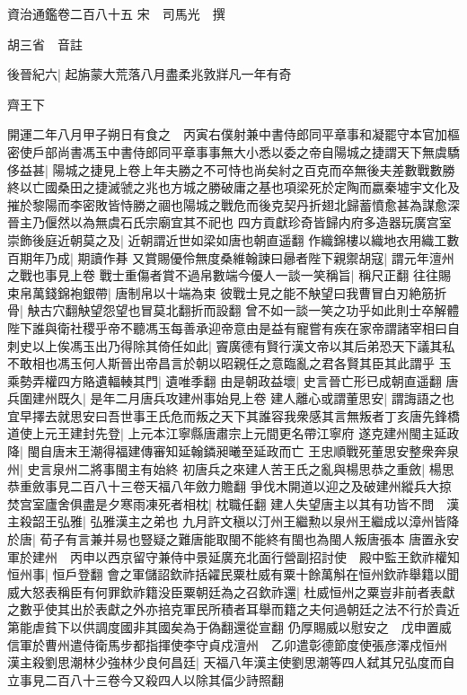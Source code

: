 資治通鑑卷二百八十五
宋　司馬光　撰

胡三省　音註

後晉紀六|{
	起旃蒙大荒落八月盡柔兆敦牂凡一年有奇}


齊王下

開運二年八月甲子朔日有食之　丙寅右僕射兼中書侍郎同平章事和凝罷守本官加樞密使戶部尚書馮玉中書侍郎同平章事事無大小悉以委之帝自陽城之捷謂天下無虞驕侈益甚|{
	陽城之捷見上卷上年夫勝之不可恃也尚矣紂之百克而卒無後夫差數戰數勝終以亡國桑田之捷滅虢之兆也方城之勝破庸之基也項梁死於定陶而嬴秦墟宇文化及摧於黎陽而李密敗皆恃勝之祻也陽城之戰危而後克契丹折翅北歸蓄憤愈甚為謀愈深晉主乃偃然以為無虞石氏宗廟宜其不祀也}
四方貢獻珍奇皆歸内府多造器玩廣宫室崇飾後庭近朝莫之及|{
	近朝謂近世如梁如唐也朝直遥翻}
作織錦樓以織地衣用織工數百期年乃成|{
	期讀作朞}
又賞賜優伶無度桑維翰諫曰曏者陛下親禦胡寇|{
	謂元年澶州之戰也事見上卷}
戰士重傷者賞不過帛數端今優人一談一笑稱旨|{
	稱尺正翻}
往往賜束帛萬錢錦袍銀帶|{
	唐制帛以十端為束}
彼戰士見之能不觖望曰我曹冒白刃絶筋折骨|{
	觖古穴翻觖望怨望也冒莫北翻折而設翻}
曾不如一談一笑之功乎如此則士卒解體陛下誰與衛社稷乎帝不聽馮玉每善承迎帝意由是益有寵嘗有疾在家帝謂諸宰相曰自刺史以上俟馮玉出乃得除其倚任如此|{
	竇廣德有賢行漢文帝以其后弟恐天下議其私不敢相也馮玉何人斯晉出帝昌言於朝以昭親任之意臨亂之君各賢其臣其此謂乎}
玉乘勢弄權四方賂遺輻輳其門|{
	遺唯季翻}
由是朝政益壞|{
	史言晉亡形已成朝直遥翻}
唐兵圍建州既久|{
	是年二月唐兵攻建州事始見上卷}
建人離心或謂董思安|{
	謂誨語之也}
宜早擇去就思安曰吾世事王氏危而叛之天下其誰容我衆感其言無叛者丁亥唐先鋒橋道使上元王建封先登|{
	上元本江寧縣唐肅宗上元間更名帶江寧府}
遂克建州閩主延政降|{
	閩自唐末王潮得福建傳審知延翰鏻昶曦至延政而亡}
王忠順戰死董思安整衆奔泉州|{
	史言泉州二將事閩主有始終}
初唐兵之來建人苦王氏之亂與楊思恭之重斂|{
	楊思恭重斂事見二百八十三卷天福八年斂力贍翻}
爭伐木開道以迎之及破建州縱兵大掠焚宫室廬舍俱盡是夕寒雨凍死者相枕|{
	枕職任翻}
建人失望唐主以其有功皆不問　漢主殺韶王弘雅|{
	弘雅漢主之弟也}
九月許文稹以汀州王繼勲以泉州王繼成以漳州皆降於唐|{
	荀子有言兼并易也豎疑之難唐能取閩不能終有閩也為閩人叛唐張本}
唐置永安軍於建州　丙申以西京留守兼侍中景延廣充北面行營副招討使　殿中監王欽祚權知恒州事|{
	恒戶登翻}
會之軍儲詔欽祚括糴民粟杜威有粟十餘萬斛在恒州欽祚舉籍以聞威大怒表稱臣有何罪欽祚籍没臣粟朝廷為之召欽祚還|{
	杜威恒州之粟豈非前者表獻之數乎使其出於表獻之外亦掊克軍民所積者耳舉而籍之夫何過朝廷之法不行於貴近第能虐貧下以供調度國非其國矣為于偽翻還從宣翻}
仍厚賜威以慰安之　戊申置威信軍於曹州遣侍衛馬步都指揮使李守貞戍澶州　乙卯遣彰德節度使張彦澤戍恒州　漢主殺劉思潮林少強林少良何昌廷|{
	天福八年漢主使劉思潮等四人弑其兄弘度而自立事見二百八十三卷今又殺四人以除其偪少詩照翻}

